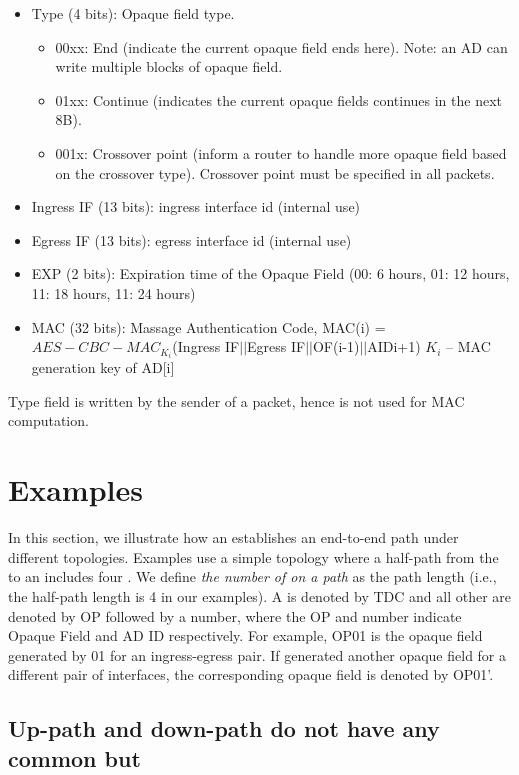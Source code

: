 \begin{itemize}
\begin{itemize}
	\item{Type (4 bits): } Opaque field type. 
		\begin{itemize}
		\item{00xx}: End (indicate the current opaque field ends here). Note: an AD can write multiple blocks of opaque field.
		\item{01xx}: Continue (indicates the current opaque fields continues in the next 8B).
		\item{001x}: Crossover point (inform a router to handle more opaque field based on the crossover type). Crossover point must be specified in all packets.
		\end{itemize}
	\item{Ingress IF (13 bits): } ingress interface id (internal use)
	\item{Egress IF (13 bits): } egress interface id (internal use)
	\item{EXP (2 bits): } Expiration time of the Opaque Field (00: 6 hours, 01: 12 hours, 11: 18 hours, 11: 24 hours)
	\item{MAC (32 bits): } Massage Authentication Code, MAC(i) = $AES-CBC-MAC_{K_i}$(Ingress IF$||$Egress IF$||$OF(i-1)$||$AIDi+1)\newline
		$K_i$ – MAC generation key of AD[i]
	\end{itemize}
Type field is written by the sender of a packet, hence is not used for MAC computation.
\end{itemize}

\section{Examples}
In this section, we illustrate how an \AD establishes an end-to-end path under different topologies. Examples use a simple topology where a half-path from the \ISDC to an \STUB \AD includes four \ADs. We define {\em the number of \ADs on a path} as the path length (i.e., the half-path length is 4 in our examples). A \ISDC \AD is denoted by TDC and all other \ADs are denoted by OP followed by a number, where the OP and number indicate Opaque Field and AD ID respectively. For example, OP01 is the opaque field generated by  01 for an ingress-egress pair. If  generated another opaque field for a different pair of interfaces, the corresponding opaque field is denoted by OP01'.

\subsection{Up-path and down-path do not have any common \AD but \ISDC}

